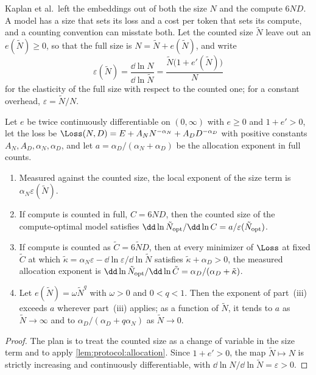 \begin{refsection}
Kaplan et al.\ left the embeddings out of both the size $N$ and the compute $6ND$. A model has a size that sets its loss and a cost per token that sets its compute, and a counting convention can misstate both. Let the counted size $\tilde N$ leave out an  $e(\tilde N)\ge0$, so that the full size is $N=\tilde N+e(\tilde N)$, and write
\[
\varepsilon(\tilde N)=\frac{\dd\ln N}{\dd\ln\tilde N}=\frac{\tilde N\bigl(1+e'(\tilde N)\bigr)}{N}
\]
for the elasticity of the full size with respect to the counted one; for a constant overhead, $\varepsilon=\tilde N/N$.

\begin{proposition}[Counting]\label{prop:protocol:counting}
Let $e$ be twice continuously differentiable on $(0,\infty)$ with $e\ge0$ and $1+e'>0$, let the loss be $\Loss(N,D)=E+A_NN^{-\alpha_N}+A_DD^{-\alpha_D}$ with positive constants $A_N,A_D,\alpha_N,\alpha_D$, and let $a=\alpha_D/(\alpha_N+\alpha_D)$ be the allocation exponent in full counts.
\begin{enumerate}
\item Measured against the counted size, the local exponent of the size term is $\alpha_N\varepsilon(\tilde N)$.
\item If compute is counted in full, $C=6ND$, then the counted size of the compute-optimal model satisfies $\dd\ln\tilde N_{\protocolopt}/\dd\ln C=a/\varepsilon(\tilde N_{\protocolopt})$.
\item If compute is counted as $\tilde C=6\tilde ND$, then at every minimizer of $\Loss$ at fixed $\tilde C$ at which $\tilde\kappa=\alpha_N\varepsilon-\dd\ln\varepsilon/\dd\ln\tilde N$ satisfies $\tilde\kappa+\alpha_D>0$, the measured allocation exponent is $\dd\ln\tilde N_{\protocolopt}/\dd\ln\tilde C=\alpha_D/(\alpha_D+\tilde\kappa)$.
\item Let $e(\tilde N)=\omega\tilde N^{q}$ with $\omega>0$ and $0<q<1$. Then the exponent of part~(iii) exceeds $a$ wherever part~(iii) applies; as a function of $\tilde N$, it tends to $a$ as $\tilde N\to\infty$ and to $\alpha_D/(\alpha_D+q\alpha_N)$ as $\tilde N\to0$.
\end{enumerate}
\end{proposition}

\begin{proof}
The plan is to treat the counted size as a change of variable in the size term and to apply \cref{lem:protocol:allocation}. Since $1+e'>0$, the map $\tilde N\mapsto N$ is strictly increasing and continuously differentiable, with $\dd\ln N/\dd\ln\tilde N=\varepsilon>0$.


\end{proof}
\end{refsection}
